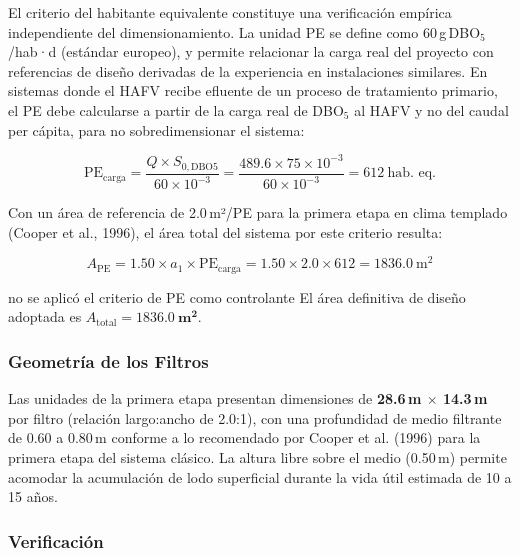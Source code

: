 \documentclass[12pt,a4paper]{article}
\begin{document}
El criterio del habitante equivalente constituye una verificación empírica independiente del dimensionamiento. La unidad PE se define como 60\,g\,DBO$_5$/hab·d (estándar europeo), y permite relacionar la carga real del proyecto con referencias de diseño derivadas de la experiencia en instalaciones similares. En sistemas donde el HAFV recibe efluente de un proceso de tratamiento primario, el PE debe calcularse a partir de la carga real de DBO$_5$ al HAFV y no del caudal per cápita, para no sobredimensionar el sistema:

\begin{equation}
\text{PE}_\text{carga} = \frac{Q \times S_{0,\text{DBO5}}}{60 \times 10^{-3}} = \frac{489.6 \times 75 \times 10^{-3}}{60 \times 10^{-3}} = 612\ \text{hab. eq.}
\end{equation}

Con un área de referencia de 2.0\,m²/PE para la primera etapa en clima templado (Cooper et al., 1996), el área total del sistema por este criterio resulta:

\begin{equation}
A_\text{PE} = 1.50 \times a_1 \times \text{PE}_\text{carga} = 1.50 \times 2.0 \times 612 = 1836.0\ \text{m}^2
\end{equation}

no se aplicó el criterio de PE como controlante El área definitiva de diseño adoptada es $A_\text{total} = \mathbf{1836.0\ \text{m}^2}$.

\subsubsection*{Geometría de los Filtros}

Las unidades de la primera etapa presentan dimensiones de \textbf{28.6\,m $\times$ 14.3\,m} por filtro (relación largo:ancho de 2.0:1), con una profundidad de medio filtrante de 0.60 a 0.80\,m conforme a lo recomendado por Cooper et al. (1996) para la primera etapa del sistema clásico. La altura libre sobre el medio (0.50\,m) permite acomodar la acumulación de lodo superficial durante la vida útil estimada de 10 a 15 años.


\subsubsection{Verificación}
\end{document}
